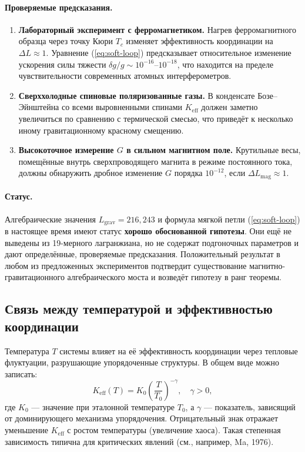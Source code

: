 \documentclass[12pt]{article}
\theoremstyle{remark}
\newcommand{\Keff}{K_{\mathrm{eff}}}
\begin{document}
	\paragraph{Проверяемые предсказания.}
	\begin{enumerate}
		\item \textbf{Лабораторный эксперимент с ферромагнетиком.} Нагрев ферромагнитного образца через точку Кюри $T_c$ изменяет эффективность координации на $\Delta L \approx 1$. Уравнение (\ref{eq:soft-loop}) предсказывает относительное изменение ускорения силы тяжести $\delta g / g \sim 10^{-16}$–$10^{-18}$, что находится на пределе чувствительности современных атомных интерферометров.
		\item \textbf{Сверххолодные спиновые поляризованные газы.} В конденсате Бозе–Эйнштейна со всеми выровненными спинами $K_{\mathrm{eff}}$ должен заметно увеличиться по сравнению с термической смесью, что приведёт к несколько иному гравитационному красному смещению.
		\item \textbf{Высокоточное измерение $G$ в сильном магнитном поле.} Крутильные весы, помещённые внутрь сверхпроводящего магнита в режиме постоянного тока, должны обнаружить дробное изменение $G$ порядка $10^{-12}$, если $\Delta L_{\mathrm{mag}} \approx 1$.
	\end{enumerate}
	
	\paragraph{Статус.}
	Алгебраические значения $L_{\mathrm{grav}} = 216, 243$ и формула мягкой петли (\ref{eq:soft-loop}) в настоящее время имеют статус \textbf{хорошо обоснованной гипотезы}. Они ещё не выведены из 19-мерного лагранжиана, но не содержат подгоночных параметров и дают определённые, проверяемые предсказания. Положительный результат в любом из предложенных экспериментов подтвердит существование магнитно-гравитационного алгебраического моста и возведёт гипотезу в ранг теоремы.
	
	\subsection{Связь между температурой и эффективностью координации}
	\label{subsec:temp-keff}
	
	Температура $T$ системы влияет на её эффективность координации через тепловые флуктуации, разрушающие упорядоченные структуры. В общем виде можно записать:
	\begin{equation}
		\Keff(T) = K_0 \left( \frac{T}{T_0} \right)^{-\gamma}, \quad \gamma > 0,
		\label{eq:keff-temp}
	\end{equation}
	где $K_0$ — значение при эталонной температуре $T_0$, а $\gamma$ — показатель, зависящий от доминирующего механизма упорядочения. Отрицательный знак отражает уменьшение $\Keff$ с ростом температуры (увеличение хаоса). Такая степенная зависимость типична для критических явлений (см., например, Ma, 1976).
	
\end{document}
